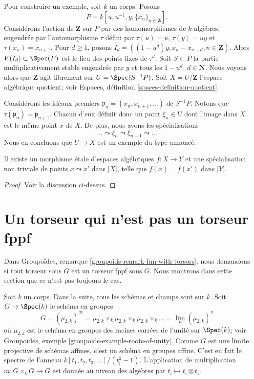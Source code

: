 \medskip\noindent
Pour construire un exemple, soit $k$ un corps.
Posons
$$
P = k[u, u^{-1}, y, \{x_n\}_{n \in \mathbf{Z}}].
$$
Considérons l'action
de $\mathbf{Z}$ sur $P$ par des homomorphismes de $k$-algèbres, engendrée par l'automorphisme
$\tau$ défini par $\tau(u) = u$, $\tau(y) = uy$ et
$\tau(x_n) = x_{n + 1}$. Pour $d \geq 1$, posons
$I_d = ((1 - u^d)y, x_n - x_{n + d}, n \in \mathbf{Z})$.
Alors $V(I_d) \subset \Spec(P)$ est le lieu des points fixes de $\tau^d$.
Soit $S \subset P$ la partie multiplicativement stable engendrée par $y$ et
tous les $1 - u^d$, $d \in \mathbf{N}$. Nous
voyons alors que $\mathbf{Z}$ agit librement sur $U = \Spec(S^{-1}P)$.
Soit $X = U/\mathbf{Z}$ l'espace algébrique quotient; voir
Espaces, définition \ref{spaces-definition-quotient}.

\medskip\noindent
Considérons les idéaux premiers $\mathfrak p_n = (x_n, x_{n + 1}, \ldots)$ de
$S^{-1}P$. Notons que $\tau(\mathfrak p_n) = \mathfrak p_{n + 1}$.
Chacun d'eux définit donc un point $\xi_n \in U$ dont l'image dans $X$ est
le même point $x$ de $X$. De plus, nous avons les spécialisations
$$
\ldots \leadsto \xi_n \leadsto \xi_{n - 1} \leadsto \ldots
$$
Nous en concluons que $U \to X$ est un exemple du type annoncé.

\begin{lemma}
\label{lemma-specializations-fibre-etale}
Il existe un morphisme étale d'espaces algébriques $f : X \to Y$
et une spécialisation non triviale de points $x \leadsto x'$ dans $|X|$, telle que
$f(x) = f(x')$ dans $|Y|$.
\end{lemma}

\begin{proof}
Voir la discussion ci-dessus.
\end{proof}







\section{Un torseur qui n'est pas un torseur fppf}
\label{section-torsor-not-fppf}

\noindent
Dans
Groupoïdes, remarque \ref{groupoids-remark-fun-with-torsors},
nous demandons si tout torseur sous $G$ est un torseur fppf sous $G$.
Nous montrons dans cette section que ce n'est pas toujours le cas.

\medskip\noindent
Soit $k$ un corps. Dans la suite, tous les schémas et champs sont sur $k$.
Soit $G \to \Spec(k)$ le schéma en groupes
$$
G = (\mu_{2, k})^\infty =
\mu_{2, k} \times_k \mu_{2, k} \times_k \mu_{2, k} \times_k \ldots =
\lim_n (\mu_{2, k})^n
$$
où $\mu_{2, k}$ est le schéma en groupes des racines carrées de l'unité sur
$\Spec(k)$; voir
Groupoïdes, exemple \ref{groupoids-example-roots-of-unity}.
Comme $G$ est une limite projective de schémas affines, c'est un schéma en groupes
affine. C'est en fait le spectre de l'anneau
$k[t_1, t_2, t_3, \ldots]/(t_i^2 - 1)$. L'application de multiplication
$m : G \times_k G \to G$ est donnée au niveau des algèbres par
$t_i \mapsto t_i \otimes t_i$.

